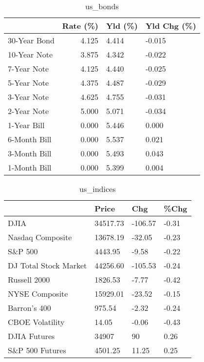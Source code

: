 \documentclass{article}%
\begin{document}
%


\begin{table}[htbp]%
\caption{us\_bonds}%
\centering%
\begin{adjustbox}{width=1\textwidth}%
\begin{tabular}{lrll}
\toprule
             &  Rate (\%) & Yld (\%) & Yld Chg (\%) \\
\midrule
30-Year Bond &     4.125 &   4.414 &      -0.015 \\
10-Year Note &     3.875 &   4.342 &      -0.022 \\
 7-Year Note &     4.125 &   4.440 &      -0.025 \\
 5-Year Note &     4.375 &   4.487 &      -0.029 \\
 3-Year Note &     4.625 &   4.755 &      -0.031 \\
 2-Year Note &     5.000 &   5.071 &      -0.034 \\
 1-Year Bill &     0.000 &   5.446 &       0.000 \\
6-Month Bill &     0.000 &   5.537 &       0.021 \\
3-Month Bill &     0.000 &   5.493 &       0.043 \\
1-Month Bill &     0.000 &   5.399 &       0.004 \\
\bottomrule
\end{tabular}
%
\end{adjustbox}%
\end{table}

%


\begin{table}[htbp]%
\caption{us\_indices}%
\centering%
\begin{adjustbox}{width=1\textwidth}%
\begin{tabular}{llll}
\toprule
                      &    Price &     Chg &  \%Chg \\
\midrule
                 DJIA & 34517.73 & -106.57 & -0.31 \\
     Nasdaq Composite & 13678.19 &  -32.05 & -0.23 \\
              S\&P 500 &  4443.95 &   -9.58 & -0.22 \\
DJ Total Stock Market & 44256.60 & -105.53 & -0.24 \\
         Russell 2000 &  1826.53 &   -7.77 & -0.42 \\
       NYSE Composite & 15929.01 &  -23.52 & -0.15 \\
         Barron's 400 &   975.54 &   -2.32 & -0.24 \\
      CBOE Volatility &    14.05 &   -0.06 & -0.43 \\
         DJIA Futures &    34907 &      90 &  0.26 \\
      S\&P 500 Futures &  4501.25 &   11.25 &  0.25 \\
\bottomrule
\end{tabular}
%
\end{adjustbox}%
\end{table}
\end{document}
